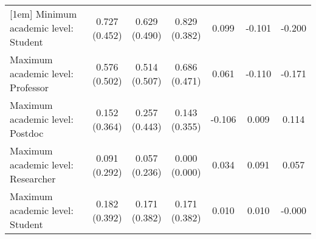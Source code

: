 \begin{table}[ht]
{\begin{tabular}{lcccccc}
[1em]
Minimum academic level: Student & \shortstack{0.727\\(0.452)} & \shortstack{0.629\\(0.490)} & \shortstack{0.829\\(0.382)} & \shortstack{0.099\\\relax[0.392]} & \shortstack{-0.101\\\relax[0.321]} & \shortstack{-0.200\\\relax[0.061]}\\
[1em]
Maximum academic level: Professor & \shortstack{0.576\\(0.502)} & \shortstack{0.514\\(0.507)} & \shortstack{0.686\\(0.471)} & \shortstack{0.061\\\relax[0.617]} & \shortstack{-0.110\\\relax[0.355]} & \shortstack{-0.171\\\relax[0.147]}\\
[1em]
Maximum academic level: Postdoc & \shortstack{0.152\\(0.364)} & \shortstack{0.257\\(0.443)} & \shortstack{0.143\\(0.355)} & \shortstack{-0.106\\\relax[0.289]} & \shortstack{0.009\\\relax[0.921]} & \shortstack{0.114\\\relax[0.238]}\\
[1em]
Maximum academic level: Researcher & \shortstack{0.091\\(0.292)} & \shortstack{0.057\\(0.236)} & \shortstack{0.000\\(0.000)} & \shortstack{0.034\\\relax[0.600]} & \shortstack{0.091\\\relax[0.070]} & \shortstack{0.057\\\relax[0.156]}\\
[1em]
Maximum academic level: Student & \shortstack{0.182\\(0.392)} & \shortstack{0.171\\(0.382)} & \shortstack{0.171\\(0.382)} & \shortstack{0.010\\\relax[0.912]} & \shortstack{0.010\\\relax[0.912]} & \shortstack{-0.000\\\relax[1.000]}\\

\end{tabular}}
\end{table}
